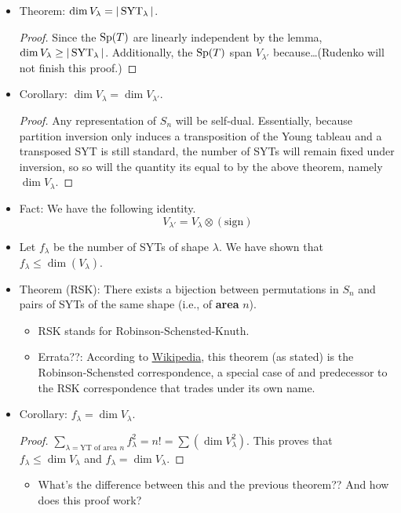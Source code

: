 \documentclass[../notes.tex]{subfiles}
\begin{document}
\begin{itemize}
\begin{proof}
    \end{proof}
    \item Theorem: $\dim V_\lambda=|\operatorname{SYT}_\lambda|$.
    \begin{proof}
        Since the $\operatorname{Sp}(T)$ are linearly independent by the lemma, $\dim V_\lambda\geq|\operatorname{SYT}_\lambda|$. Additionally, the $\operatorname{Sp}(T)$ span $V_{\lambda'}$ because\dots (Rudenko will not finish this proof.)
    \end{proof}
    \item Corollary: $\dim V_\lambda=\dim V_{\lambda'}$.
    \begin{proof}
        Any representation of $S_n$ will be self-dual. Essentially, because partition inversion only induces a transposition of the Young tableau and a transposed SYT is still standard, the number of SYTs will remain fixed under inversion, so so will the quantity its equal to by the above theorem, namely $\dim V_\lambda$.
    \end{proof}
    \item Fact: We have the following identity.
    \begin{equation*}
        V_{\lambda'} = V_\lambda\otimes(\text{sign})
    \end{equation*}
    \item Let $f_\lambda$ be the number of SYTs of shape $\lambda$. We have shown that $f_\lambda\leq\dim(V_\lambda)$.
    \item Theorem (RSK): There exists a bijection between permutations in $S_n$ and pairs of SYTs of the same shape (i.e., of \textbf{area} $n$).
    \begin{itemize}
        \item RSK stands for Robinson-Schensted-Knuth.
        \item Errata??: According to \href{https://en.wikipedia.org/wiki/Robinson%E2%80%93Schensted_correspondence}{Wikipedia}, this theorem (as stated) is the Robinson-Schensted correspondence, a special case of and predecessor to the RSK correspondence that trades under its own name.
    \end{itemize}
    \item Corollary: $f_\lambda=\dim V_\lambda$.
    \begin{proof}
        $\sum_{\lambda=\text{YT of area }n}f_\lambda^2
        = n!
        = \sum(\dim V_\lambda^2)$.
        This proves that $f_\lambda\leq\dim V_\lambda$ and $f_\lambda=\dim V_\lambda$.
    \end{proof}
    \begin{itemize}
        \item What's the difference between this and the previous theorem?? And how does this proof work?

\end{itemize}
\end{itemize}
\end{document}
